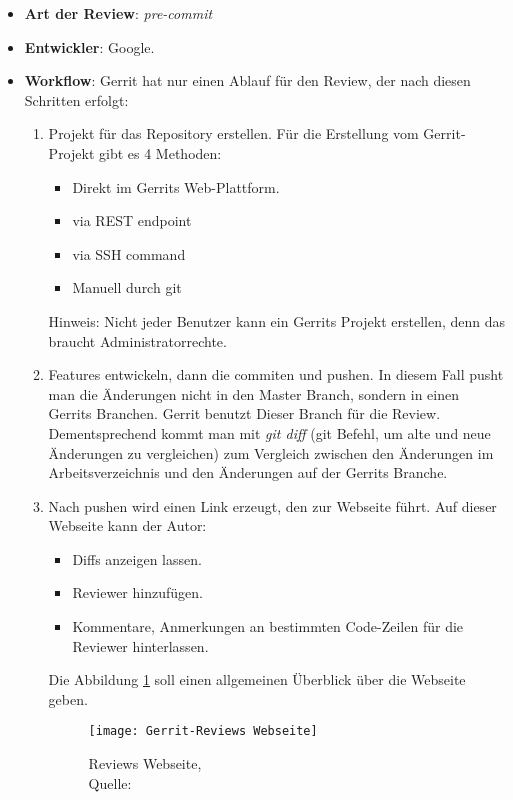 \begin{itemize}
	\item \textbf{Art der Review}: \textit{pre-commit}
	\item \textbf{Entwickler}: Google.
	\item \textbf{Workflow}: Gerrit hat nur einen Ablauf für den Review, der nach diesen Schritten erfolgt:
		\begin{enumerate}
			\item Projekt für das Repository erstellen. Für die Erstellung vom Gerrit-Projekt gibt es 4 Methoden:
			\begin{itemize}
				\item Direkt im Gerrits Web-Plattform.
				\item via REST endpoint
				\item via SSH command
				\item Manuell durch git
			\end{itemize}
			Hinweis: Nicht jeder Benutzer kann ein Gerrits Projekt erstellen, denn das braucht Administratorrechte.		
			
			\item Features entwickeln, dann die commiten und pushen. In diesem Fall pusht man die Änderungen nicht in den Master Branch, sondern in einen Gerrits Branchen.
				Gerrit benutzt Dieser Branch für die Review. Dementsprechend kommt man mit \textit{git diff} (git Befehl, um alte und neue Änderungen zu vergleichen) zum Vergleich
				zwischen den Änderungen im Arbeitsverzeichnis und den Änderungen auf der Gerrits Branche.
			\item Nach pushen wird einen Link erzeugt, den zur Webseite führt. Auf dieser Webseite kann der Autor: 
			\begin{itemize}
				\item Diffs anzeigen lassen.
				\item Reviewer hinzufügen.
				\item Kommentare, Anmerkungen an bestimmten Code-Zeilen für die Reviewer hinterlassen.
			\end{itemize}
			Die Abbildung \ref{fig:Gerrit-Reviews Webseite} soll einen allgemeinen Überblick über die Webseite geben.
			
			\begin{figure}[H]
				\centering
				\texttt{[image: Gerrit-Reviews Webseite]}
				\caption[Gerrit]{Reviews Webseite,\\ Quelle: \cite{Gerrit}}
				\label{fig:Gerrit-Reviews Webseite}
			\end{figure}
						

\end{enumerate}
\end{itemize}
